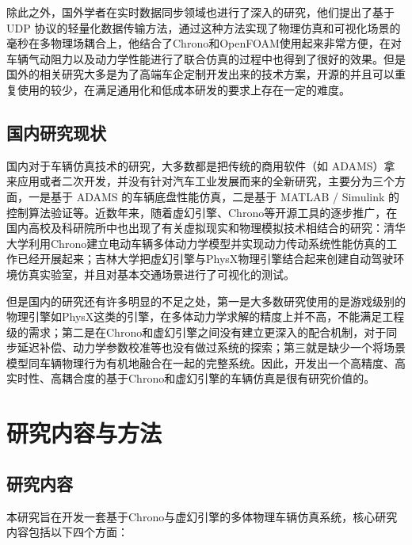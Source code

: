 除此之外，国外学者在实时数据同步领域也进行了深入的研究，他们提出了基于UDP 协议的轻量化数据传输方法，通过这种方法实现了物理仿真和可视化场景的毫秒在多物理场耦合上，他结合了Chrono和OpenFOAM使用起来非常方便，在对车辆气动阻力以及动力学性能进行了联合仿真的过程中也得到了很好的效果。但是国外的相关研究大多是为了高端车企定制开发出来的技术方案，开源的并且可以重复使用的较少，在满足通用化和低成本研发的要求上存在一定的难度。

\subsection{国内研究现状}

国内对于车辆仿真技术的研究，大多数都是把传统的商用软件（如 ADAMS）拿来应用或者二次开发，并没有针对汽车工业发展而来的全新研究，主要分为三个方面，一是基于 ADAMS 的车辆底盘性能仿真，二是基于 MATLAB / Simulink 的控制算法验证等。近数年来，随着虚幻引擎、Chrono等开源工具的逐步推广，在国内高校及科研院所中也出现了有关虚拟现实和物理模拟技术相结合的研究：清华大学利用Chrono建立电动车辆多体动力学模型并实现动力传动系统性能仿真的工作已经开展起来；吉林大学把虚幻引擎与PhysX物理引擎结合起来创建自动驾驶环境仿真实验室，并且对基本交通场景进行了可视化的测试。

但是国内的研究还有许多明显的不足之处，第一是大多数研究使用的是游戏级别的物理引擎如PhysX这类的引擎，在多体动力学求解的精度上并不高，不能满足工程级的需求；第二是在Chrono和虚幻引擎之间没有建立更深入的配合机制，对于同步延迟补偿、动力学参数校准等也没有做过系统的探索；第三就是缺少一个将场景模型同车辆物理行为有机地融合在一起的完整系统。因此，开发出一个高精度、高实时性、高耦合度的基于Chrono和虚幻引擎的车辆仿真是很有研究价值的。

\section{研究内容与方法}

\subsection{研究内容}

本研究旨在开发一套基于Chrono与虚幻引擎的多体物理车辆仿真系统，核心研究内容包括以下四个方面：

